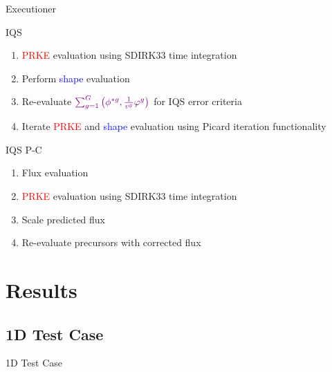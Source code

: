 \documentclass[8pt]{beamer}
\newcommand{\ben}{\begin{enumerate}}
\newcommand{\een}{\end{enumerate}}
\newcommand{\tcr}[1]{\textcolor{red}{#1}}
\newcommand{\tcb}[1]{\textcolor{blue}{#1}}
\newcommand{\tcp}[1]{\textcolor{violet}{#1}}
\begin{document}
\begin{frame}{Executioner}

\begin{block}{IQS}
\ben
\item \tcr{PRKE} evaluation using SDIRK33 time integration
\item Perform \tcb{shape} evaluation
\item Re-evaluate $\tcp{\sum_{g=1}^G\left(\phi^{*g},\frac{1}{v^g}\varphi^g\right)}$ for IQS error criteria
\item Iterate \tcr{PRKE} and \tcb{shape} evaluation using Picard iteration functionality
\een
\end{block}

\begin{block}{IQS P-C}
\ben
\item Flux evaluation
\item \tcr{PRKE} evaluation using SDIRK33 time integration
\item Scale predicted flux
\item Re-evaluate precursors with corrected flux
\een
\end{block}


\end{frame}

\section{Results}

\subsection{1D Test Case}

\begin{frame}{1D Test Case}


\end{frame}
\end{document}
